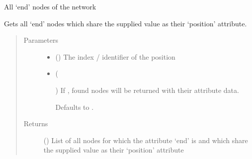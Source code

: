 \documentclass[letterpaper,10pt,english]{sphinxmanual}
\begin{document}
\begin{fulllineitems}
\begin{fulllineitems}
\label{\detokenize{cockatoo:cockatoo.KnitNetworkBase.end_nodes}}
All ‘end’ nodes of the network

\end{fulllineitems}


\begin{fulllineitems}
\label{\detokenize{cockatoo:cockatoo.KnitNetworkBase.ends_on_position}}
Gets all ‘end’ nodes which share the supplied value as their ‘position’
attribute.
\begin{quote}\begin{description}
\item[{Parameters}] \leavevmode\begin{itemize}
\item {} 
 () \textendash{} The index / identifier of the position

\item {} 
 (%
\begin{footnote}[86]\sphinxAtStartFootnote
{}
%
\end{footnote}\sphinxstyleliteralemphasis{\sphinxupquote{, }}) \textendash{} 
If , found nodes will be returned with their attribute
data.

Defaults to .


\end{itemize}

\item[{Returns}] \leavevmode
{} () \textendash{} List of all nodes for which the attribute ‘end’ is  and
which share the supplied value as their ‘position’ attribute


\end{description}
\end{quote}
\end{fulllineitems}
\end{fulllineitems}
\end{document}
